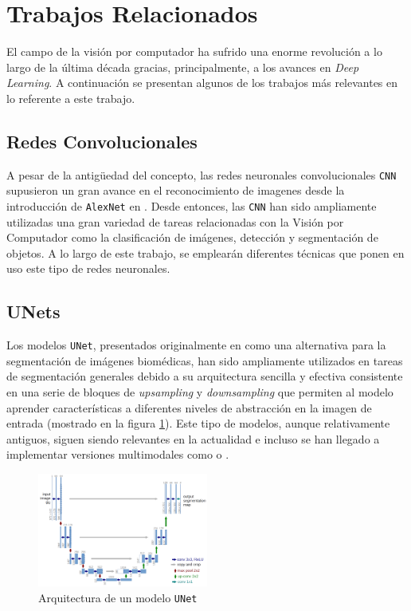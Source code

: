 \documentclass[12pt,a4paper]{report}
\begin{document}
\section{Trabajos Relacionados}
\label{sec:related_work}
El campo de la visión por computador ha sufrido una enorme revolución a lo largo de la última década gracias, principalmente, a los avances en \textit{Deep Learning}. A continuación se presentan algunos de los trabajos más relevantes en lo referente a este trabajo.

\subsection{Redes Convolucionales}
\label{subsec:cnn}
A pesar de la antigüedad del concepto, las redes neuronales convolucionales \texttt{CNN} supusieron un gran avance en el reconocimiento de imagenes desde la introducción de \texttt{AlexNet} en \cite{NIPS2012_c399862d}. Desde entonces, las \texttt{CNN} han sido ampliamente utilizadas una gran variedad de tareas relacionadas con la Visión por Computador como la clasificación de imágenes, detección y segmentación de objetos. A lo largo de este trabajo, se emplearán diferentes técnicas que ponen en uso este tipo de redes neuronales.

\subsection{UNets}
\label{subsec:unets}
Los modelos \texttt{UNet}, presentados originalmente en \cite{ronneberger2015unetconvolutionalnetworksbiomedical} como una alternativa para la segmentación de imágenes biomédicas, han sido ampliamente utilizados en tareas de segmentación generales debido a su arquitectura sencilla y efectiva consistente en una serie de bloques de \textit{upsampling} y \textit{downsampling} que permiten al modelo aprender características a diferentes niveles de abstracción en la imagen de entrada (mostrado en la figura \ref{fig:unet-architecture}). Este tipo de modelos, aunque relativamente antiguos, siguen siendo relevantes en la actualidad e incluso se han llegado a implementar versiones multimodales como \cite{huang2024mmaunetmultimodalasymmetricunet} o \cite{marinov2023mirrorunetmarryingmultimodal}.

\begin{figure}[!h]
    \centering
    \includegraphics[width=0.5\textwidth]{media/model/unet.png}
    \caption{Arquitectura de un modelo \texttt{UNet}}
    \label{fig:unet-architecture}
\end{figure}
\end{document}
